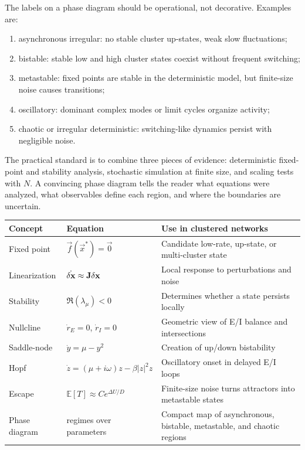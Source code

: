 The labels on a phase diagram should be operational, not decorative. Examples are:
\begin{enumerate}[leftmargin=*]
  \item asynchronous irregular: no stable cluster up-states, weak slow fluctuations;
  \item bistable: stable low and high cluster states coexist without frequent switching;
  \item metastable: fixed points are stable in the deterministic model, but finite-size noise causes transitions;
  \item oscillatory: dominant complex modes or limit cycles organize activity;
  \item chaotic or irregular deterministic: switching-like dynamics persist with negligible noise.
\end{enumerate}

The practical standard is to combine three pieces of evidence: deterministic fixed-point and stability analysis, stochastic simulation at finite size, and scaling tests with $N$. A convincing phase diagram tells the reader what equations were analyzed, what observables define each region, and where the boundaries are uncertain.

\begin{chaptersummary}

\begin{center}
\renewcommand{\arraystretch}{1.5}
\begin{tabularx}{\textwidth}{@{}l X X@{}}
  \toprule
  \textbf{Concept} & \textbf{Equation} & \textbf{Use in clustered networks} \\
  \midrule
  Fixed point &
  $\vec{f}(\vec{x}^*)=\vec{0}$ &
  Candidate low-rate, up-state, or multi-cluster state \\
  Linearization &
  $\dot{\delta\mathbf{x}}\approx \mathbf{J}\delta\mathbf{x}$ &
  Local response to perturbations and noise \\
  Stability &
  $\Re(\lambda_\mu)<0$ &
  Determines whether a state persists locally \\
  Nullcline &
  $\dot r_E=0$, $\dot r_I=0$ &
  Geometric view of E/I balance and intersections \\
  Saddle-node &
  $\dot y=\mu-y^2$ &
  Creation of up/down bistability \\
  Hopf &
  $\dot z=(\mu+i\omega)z-\beta|z|^2z$ &
  Oscillatory onset in delayed E/I loops \\
  Escape &
  $\mathbb{E}[T]\approx C e^{\Delta U/D}$ &
  Finite-size noise turns attractors into metastable states \\
  Phase diagram &
  regimes over parameters &
  Compact map of asynchronous, bistable, metastable, and chaotic regions \\
  \bottomrule
\end{tabularx}
\end{center}

\end{chaptersummary}

